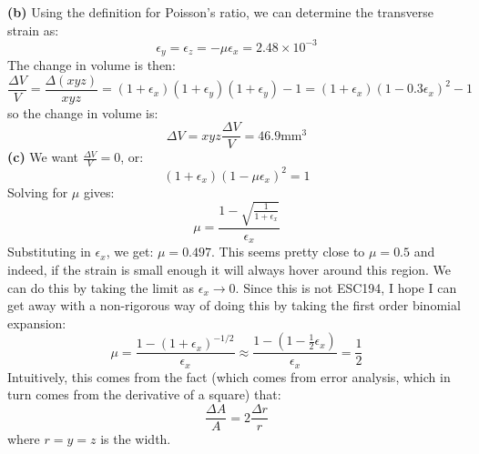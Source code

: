 \documentclass{article}
\begin{document}
\textbf{(b)} Using the definition for Poisson's ratio, we can determine the transverse strain as:
\begin{equation}
    \epsilon_y=\epsilon_z=-\mu \epsilon_x=\boxed{2.48 \times 10^{-3}}
    \label{eq:}
\end{equation}
The change in volume is then:
\begin{equation}
    \frac{\Delta V}{V} = \frac{\Delta(xyz)}{xyz}=(1+\epsilon_x)(1+\epsilon_y)(1+\epsilon_y)-1 = (1+\epsilon_x)(1-0.3\epsilon_x)^2 - 1
    \label{eq:}
\end{equation}
so the change in volume is:
\begin{equation}
    \Delta V= xyz \frac{\Delta V}{V} =\boxed{46.9\si{\milli\meter\cubed}}
    \label{eq:}
\end{equation}
\textbf{(c)} We want $\frac{\Delta V}{V}=0$, or:
\begin{equation}
    (1+\epsilon_x)(1-\mu \epsilon_x)^2=1
    \label{eq:}
\end{equation}
Solving for $\mu$ gives:
\begin{equation}
    \mu = \frac{1-\sqrt{\frac{1}{1+\epsilon_x}}}{\epsilon_x}
    \label{eq:}
\end{equation}
Substituting in $\epsilon_x$, we get: $\boxed{\mu=0.497}.$ This seems pretty close to $\mu=0.5$ and indeed, if the strain is small enough it will always hover around this region. We can do this by taking the limit as $\epsilon_x \to 0$. Since this is not ESC194, I hope I can get away with a non-rigorous way of doing this by taking the first order binomial expansion:
\begin{equation}
    \mu = \frac{1-(1+\epsilon_x)^{-1/2}}{\epsilon_x}\approx \frac{1-(1-\frac{1}{2}\epsilon_x)}{\epsilon_x}=\frac{1}{2}
    \label{eq:}
\end{equation}
Intuitively, this comes from the fact (which comes from error analysis, which in turn comes from the derivative of a square) that:
\begin{equation}
    \frac{\Delta A}{A} = 2\frac{\Delta r}{r}
    \label{eq:}
\end{equation}
where $r=y=z$ is the width.

\newpage
\end{document}
